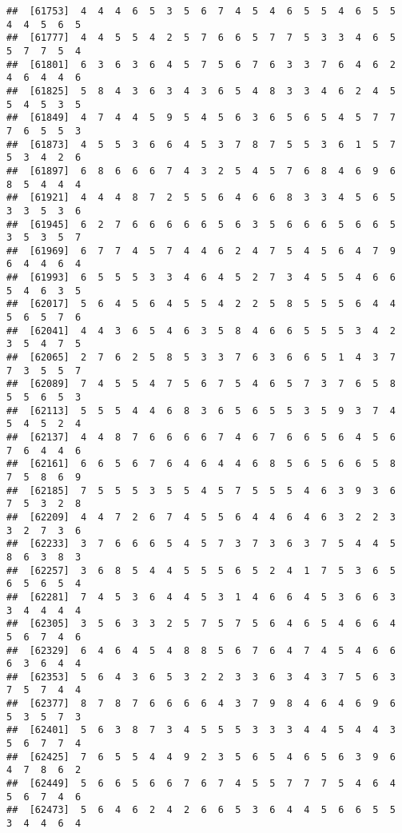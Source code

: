 \documentclass[
]{book}
\begin{document}
\begin{verbatim}
##  [61753]  4  4  4  6  5  3  5  6  7  4  5  4  6  5  5  4  6  5  5  4  4  5  6  5
##  [61777]  4  4  5  5  4  2  5  7  6  6  5  7  7  5  3  3  4  6  5  5  7  7  5  4
##  [61801]  6  3  6  3  6  4  5  7  5  6  7  6  3  3  7  6  4  6  2  4  6  4  4  6
##  [61825]  5  8  4  3  6  3  4  3  6  5  4  8  3  3  4  6  2  4  5  5  4  5  3  5
##  [61849]  4  7  4  4  5  9  5  4  5  6  3  6  5  6  5  4  5  7  7  7  6  5  5  3
##  [61873]  4  5  5  3  6  6  4  5  3  7  8  7  5  5  3  6  1  5  7  5  3  4  2  6
##  [61897]  6  8  6  6  6  7  4  3  2  5  4  5  7  6  8  4  6  9  6  8  5  4  4  4
##  [61921]  4  4  4  8  7  2  5  5  6  4  6  6  8  3  3  4  5  6  5  3  3  5  3  6
##  [61945]  6  2  7  6  6  6  6  6  5  6  3  5  6  6  6  5  6  6  5  3  5  3  5  7
##  [61969]  6  7  7  4  5  7  4  4  6  2  4  7  5  4  5  6  4  7  9  6  4  4  6  4
##  [61993]  6  5  5  5  3  3  4  6  4  5  2  7  3  4  5  5  4  6  6  5  4  6  3  5
##  [62017]  5  6  4  5  6  4  5  5  4  2  2  5  8  5  5  5  6  4  4  5  6  5  7  6
##  [62041]  4  4  3  6  5  4  6  3  5  8  4  6  6  5  5  5  3  4  2  3  5  4  7  5
##  [62065]  2  7  6  2  5  8  5  3  3  7  6  3  6  6  5  1  4  3  7  7  3  5  5  7
##  [62089]  7  4  5  5  4  7  5  6  7  5  4  6  5  7  3  7  6  5  8  5  5  6  5  3
##  [62113]  5  5  5  4  4  6  8  3  6  5  6  5  5  3  5  9  3  7  4  5  4  5  2  4
##  [62137]  4  4  8  7  6  6  6  6  7  4  6  7  6  6  5  6  4  5  6  7  6  4  4  6
##  [62161]  6  6  5  6  7  6  4  6  4  4  6  8  5  6  5  6  6  5  8  7  5  8  6  9
##  [62185]  7  5  5  5  3  5  5  4  5  7  5  5  5  4  6  3  9  3  6  7  5  3  2  8
##  [62209]  4  4  7  2  6  7  4  5  5  6  4  4  6  4  6  3  2  2  3  3  2  7  3  6
##  [62233]  3  7  6  6  6  5  4  5  7  3  7  3  6  3  7  5  4  4  5  8  6  3  8  3
##  [62257]  3  6  8  5  4  4  5  5  5  6  5  2  4  1  7  5  3  6  5  6  5  6  5  4
##  [62281]  7  4  5  3  6  4  4  5  3  1  4  6  6  4  5  3  6  6  3  3  4  4  4  4
##  [62305]  3  5  6  3  3  2  5  7  5  7  5  6  4  6  5  4  6  6  4  5  6  7  4  6
##  [62329]  6  4  6  4  5  4  8  8  5  6  7  6  4  7  4  5  4  6  6  6  3  6  4  4
##  [62353]  5  6  4  3  6  5  3  2  2  3  3  6  3  4  3  7  5  6  3  7  5  7  4  4
##  [62377]  8  7  8  7  6  6  6  6  4  3  7  9  8  4  6  4  6  9  6  5  3  5  7  3
##  [62401]  5  6  3  8  7  3  4  5  5  5  3  3  3  4  4  5  4  4  3  5  6  7  7  4
##  [62425]  7  6  5  5  4  4  9  2  3  5  6  5  4  6  5  6  3  9  6  4  7  8  6  2
##  [62449]  5  6  6  5  6  6  7  6  7  4  5  5  7  7  7  5  4  6  4  5  6  7  4  6
##  [62473]  5  6  4  6  2  4  2  6  6  5  3  6  4  4  5  6  6  5  5  3  4  4  6  4

\end{verbatim}
\end{document}
